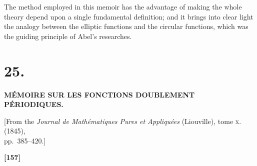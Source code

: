 \documentclass[11pt,a4paper]{book}
\begin{document}
The method employed in this memoir has the advantage of making the whole theory
depend upon a single fundamental definition; and it brings into clear light the analogy
between the elliptic functions and the circular functions, which was the guiding principle
of Abel's researches.
\clearpage


\setlength{\parindent}{1em}
\setlength{\parskip}{0.3em}

\section*{25.}

\begin{center}
\textbf{M\'EMOIRE SUR LES FONCTIONS DOUBLEMENT P\'ERIODIQUES.}
\end{center}

\begin{center}
[From the \textit{Journal de Math\'ematiques Pures et Appliqu\'ees} (Liouville), tome \textsc{x}. (1845),\\
pp.~385--420.]
\end{center}


\textbf{[157]}
\end{document}
